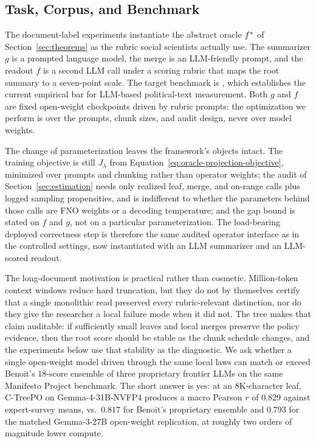 \subsection{Task, Corpus, and Benchmark}\label{sec:benoit-task}

The document-label experiments instantiate the abstract oracle
$f^\ast$ of Section~\ref{sec:theorems} as the rubric social scientists
actually use. The summarizer $g$ is a prompted language model, the
merge is an LLM-friendly prompt, and the readout $f$ is a second LLM
call under a scoring rubric that maps the root summary to a
seven-point scale. The target benchmark is
\citet{BenoitEtAl2025}, which establishes the current empirical bar
for LLM-based political-text measurement. Both $g$ and $f$ are fixed
open-weight checkpoints driven by rubric prompts: the optimization we
perform is over the prompts, chunk sizes, and audit design, never over
model weights.

The change of parameterization leaves the framework's objects intact.
The training objective is still $J_\lambda$ from
Equation~\eqref{eq:oracle-projection-objective}, minimized over prompts
and chunking rather than operator weights; the audit of
Section~\ref{sec:estimation} needs only realized leaf, merge, and
on-range calls plus logged sampling propensities, and is indifferent to
whether the parameters behind those calls are FNO weights or a decoding
temperature; and the gap bound is stated on $f$ and $g$, not on a
particular parameterization. The load-bearing deployed correctness step
is therefore the same audited operator interface as in the controlled
settings, now instantiated with an LLM summarizer and an LLM-scored
readout.

The long-document motivation is practical rather than cosmetic.
Million-token context windows reduce hard truncation, but they do not
by themselves certify that a single monolithic read preserved every
rubric-relevant distinction, nor do they give the researcher a local
failure mode when it did not. The tree makes that claim auditable: if
sufficiently small leaves and local merges preserve the policy
evidence, then the root score should be stable as the chunk schedule
changes, and the experiments below use that stability as the
diagnostic. We ask whether a single open-weight model driven through
the same local laws can match or exceed Benoit's $18$-score ensemble
of three proprietary frontier LLMs on the same Manifesto Project
benchmark. The short answer is yes: at an $8\mathrm{K}$-character
leaf, C-TreePO on Gemma-4-31B-NVFP4 produces a macro Pearson $r$ of
$0.829$ against expert-survey means, vs.\ $0.817$ for Benoit's
proprietary ensemble and $0.793$ for the matched Gemma-3-27B
open-weight replication, at roughly two orders of magnitude lower
compute.

